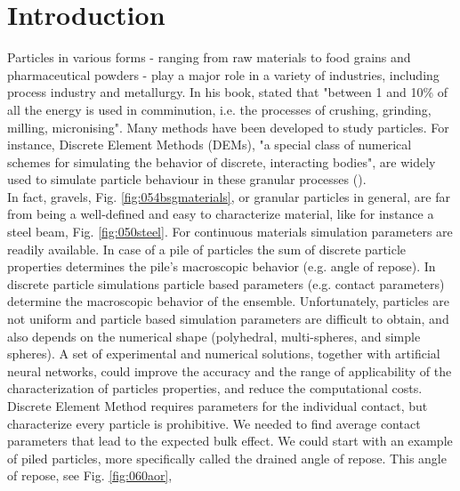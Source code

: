 
\part{Introduction}
\label{par:introduction}

Particles in various forms - ranging from raw materials to food grains and pharmaceutical powders - 
play a major role in a variety of industries, including process industry and metallurgy. 
In his book, \citet{RefWorks:117} stated that "between 1 and 10\% of all the energy is used in 
comminution, i.e. the processes of crushing, grinding, milling, micronising". 
Many methods have been developed to study particles.
For instance, Discrete Element Methods (\acs{DEMs}), "a special class of numerical
schemes for simulating the behavior of discrete, interacting bodies", are widely used to 
simulate particle behaviour in these granular processes
(\citet{RefWorks:130}).\\ 


In fact, gravels, Fig. \ref{fig:054bsgmaterials}, or granular particles in
general, are far from being a well-defined and easy to characterize material,
like for instance a steel beam, Fig.
\ref{fig:050steel}. For continuous materials simulation
parameters are readily available.
In case of a pile of particles the sum of discrete particle properties determines the pile's macroscopic behavior 
(e.g. angle of repose).
In discrete particle simulations particle based parameters (e.g. contact parameters) determine the macroscopic behavior 
of the ensemble.
Unfortunately, particles are not uniform and particle based simulation
parameters are difficult to obtain, and also depends on the numerical shape
(polyhedral, multi-spheres, and simple spheres).
A set of experimental and numerical solutions, together with artificial neural
networks, could improve the accuracy and the range of applicability of the
characterization of particles properties, and reduce the computational costs.
Discrete Element Method requires parameters for the individual contact, but characterize every particle is prohibitive.
We needed to find average contact parameters that lead to the expected bulk
effect.
We could start with an example of piled particles, more specifically called the
drained angle of repose. This angle of repose, see Fig. \ref{fig:060aor},
